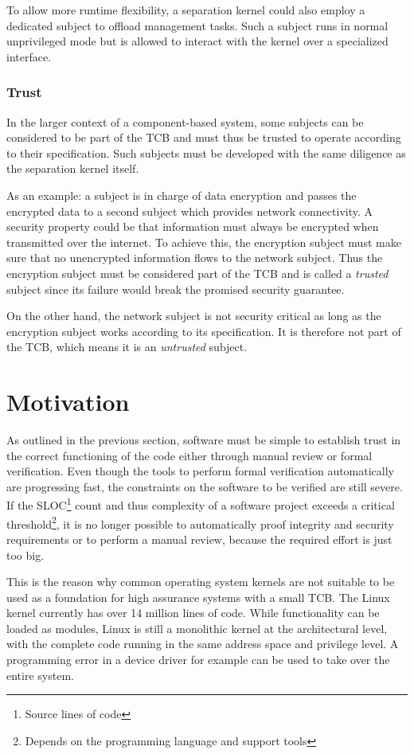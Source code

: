 To allow more runtime flexibility, a separation kernel could also employ a
dedicated subject to offload management tasks. Such a subject runs in normal
unprivileged mode but is allowed to interact with the kernel over a specialized
interface.

\subsubsection{Trust}
In the larger context of a component-based system, some subjects can be
considered to be part of the TCB and must thus be trusted to operate according
to their specification. Such subjects must be developed with the same diligence
as the separation kernel itself.

As an example: a subject is in charge of data encryption and passes the
encrypted data to a second subject which provides network connectivity. A
security property could be that information must always be encrypted when
transmitted over the internet. To achieve this, the encryption subject must
make sure that no unencrypted information flows to the network subject. Thus
the encryption subject must be considered part of the TCB and is called a
\emph{trusted} subject since its failure would break the promised security
guarantee.

On the other hand, the network subject is not security critical as long as the
encryption subject works according to its specification. It is therefore not
part of the TCB, which means it is an \emph{untrusted} subject.

\section{Motivation}
As outlined in the previous section, software must be simple to establish trust
in the correct functioning of the code either through manual review or formal
verification. Even though the tools to perform formal verification
automatically are progressing fast, the constraints on the software to be
verified are still severe. If the SLOC\footnote{Source lines of
code} count and thus complexity of a software project exceeds a
critical threshold\footnote{Depends on the programming language and support
tools}, it is no longer possible to automatically proof integrity and security
requirements or to perform a manual review, because the required effort is just
too big.

This is the reason why common operating system kernels are not suitable to be
used as a foundation for high assurance systems with a small TCB. The
Linux kernel currently has over 14 million lines of code. While
functionality can be loaded as modules, Linux is still a
monolithic kernel at the architectural level, with the
complete code running in the same address space and privilege level. A
programming error in a device driver for example can be used to take over the
entire system.

